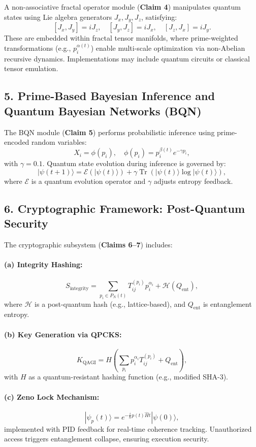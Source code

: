 \documentclass{article}
\theoremstyle{plain}
\theoremstyle{claimstyle}
\begin{document}
A non-associative fractal operator module (\textbf{Claim 4}) manipulates quantum states using Lie algebra generators \(J_x, J_y, J_z\), satisfying:
\[
[J_x, J_y] = i J_z, \quad [J_y, J_z] = i J_x, \quad [J_z, J_x] = i J_y.
\]
These are embedded within fractal tensor manifolds, where prime-weighted transformations (e.g., \(p_i^{\alpha(t)}\)) enable multi-scale optimization via non-Abelian recursive dynamics. Implementations may include quantum circuits or classical tensor emulation.

\subsection*{5. Prime-Based Bayesian Inference and Quantum Bayesian Networks (BQN)}

The BQN module (\textbf{Claim 5}) performs probabilistic inference using prime-encoded random variables:
\[
X_i = \phi(p_i), \quad \phi(p_i) = p_i^{\beta(t)} e^{-\gamma p_i},
\]
with \(\gamma = 0.1\). Quantum state evolution during inference is governed by:
\[
|\psi(t+1)\rangle = \mathcal{E}(|\psi(t)\rangle) + \gamma \operatorname{Tr}(|\psi(t)\rangle \log |\psi(t)\rangle),
\]
where \(\mathcal{E}\) is a quantum evolution operator and \(\gamma\) adjusts entropy feedback.

\subsection*{6. Cryptographic Framework: Post-Quantum Security}

The cryptographic subsystem (\textbf{Claims 6–7}) includes:

\paragraph{(a) Integrity Hashing:}
\[
S_{\text{integrity}} = \sum_{p_i \in P_N(t)} T_{ij}^{(p_i)} p_i^{\alpha_i} + \mathcal{H}(Q_{\text{ent}}),
\]
where \(\mathcal{H}\) is a post-quantum hash (e.g., lattice-based), and \(Q_{\text{ent}}\) is entanglement entropy.

\paragraph{(b) Key Generation via QPCKS:}
\[
K_{\text{QAGI}} = H\left(\sum_{p_i} p_i^{\alpha_i} T_{ij}^{(p_i)} + Q_{\text{ent}}\right),
\]
with \(H\) as a quantum-resistant hashing function (e.g., modified SHA-3).

\paragraph{(c) Zeno Lock Mechanism:}
\[
|\psi_p(t)\rangle = e^{- \frac{i}{\hbar} p(t) \hat{H} t} |\psi(0)\rangle,
\]
implemented with PID feedback for real-time coherence tracking. Unauthorized access triggers entanglement collapse, ensuring execution security.
\end{document}
